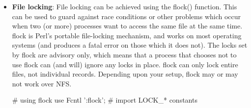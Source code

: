 \documentclass{report}
\begin{document}
\begin{itemize}
\begin{perlcode}
                # Closing the pipe handle causes sort to cease thus giving output
                close $sort_fh;
            \end{perlcode}
        \item \textbf{Piping output example}
            \bigbreak \noindent 
            \begin{perlcode}
            #!/usr/bin/perl -w
            # This program allows us to read a file from another machine
            # using secure shell. This is most useful if we can login without
            # a password (eg, established keys).
            use strict;

            # Process our command line arguments, and complain if we don’t
            # have both a host and filename.
            my ($host, $file) = @ARGV;
            unless ($host and $file) {
                die "Usage: $0 host filename\n";
            }

            open (SSH, "ssh $host cat $file |") or die "Can’t open pipe: $!";

            while(<SSH>) {
                # We can process the file in any way we like here.
                # In this particular case, we’ll simply print it to
                # our STDOUT.
                print;
            }
            \end{perlcode}
        \item \textbf{File locking}: File locking can be achieved using the flock() function. This can be used to guard against race conditions or other problems which occur when two (or more) processes want to access the same file at the same time.
            \bigbreak \noindent 
            flock is Perl’s portable file-locking mechanism, and works on most operating systems (and produces a fatal error on those which it does not). The locks set by flock are advisory only, which means that a process that chooses not to use flock can (and will) ignore any locks in place. flock can only lock entire files, not individual records. Depending upon your setup, flock may or may not work over NFS.
            \bigbreak \noindent 
            \begin{perlcode}
                # using flock
                use Fcntl ’:flock’; # import LOCK_* constants


\end{perlcode}
\end{itemize}
\end{document}
